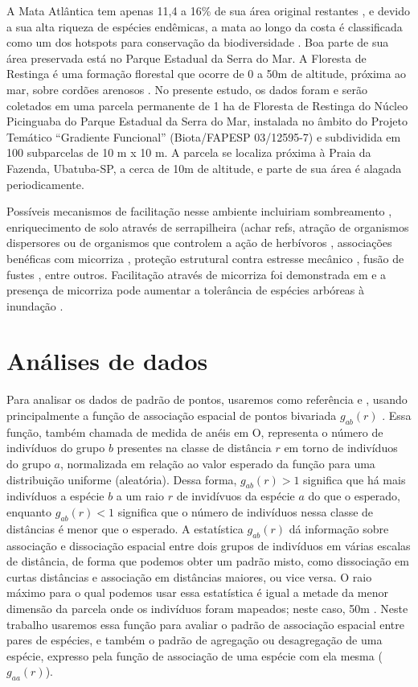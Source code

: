 \documentclass[twoside,12pt,a4paper]{report}
\begin{document}
A Mata Atlântica tem apenas 11,4 a 16\% de sua área original restantes \citep{Ribeiro2009}, e
devido a sua alta riqueza de espécies endêmicas, a mata ao longo da costa é classificada como um dos
hotspots para conservação da biodiversidade \citep{Myers2000}. Boa parte de sua área preservada
está no Parque Estadual da Serra do Mar. A Floresta de Restinga é uma formação florestal que ocorre
de 0 a 50m de altitude, próxima ao mar, sobre cordões arenosos \citep{Joly2008}. No presente
estudo, os dados foram e serão coletados em uma parcela permanente de 1 ha de Floresta de Restinga
do Núcleo Picinguaba do Parque Estadual da Serra do Mar, instalada no âmbito do Projeto Temático
“Gradiente Funcional” (Biota/FAPESP 03/12595-7) e subdividida em 100 subparcelas de 10 m x 10 m. A
parcela se localiza próxima à Praia da Fazenda, Ubatuba-SP, a cerca de 10m de altitude, e parte de
sua área é alagada periodicamente.

Possíveis mecanismos de facilitação nesse ambiente incluiriam sombreamento
\citep{Castanho2014, etc}, enriquecimento de solo através de serrapilheira (achar refs, atração de
organismos dispersores \citep{achar refs CallawayBook} ou de organismos que controlem a ação de
herbívoros \citep{refs}, associações benéficas com micorriza \citep{Simard1997}, proteção
estrutural contra estresse mecânico \citep{refs}, fusão de fustes \citep{McIntire2011}, entre
outros. Facilitação através de micorriza foi demonstrada em \citep{Simard1997} e a presença de
micorriza pode aumentar a tolerância de espécies arbóreas à inundação \citep{Fougnies2007}. 

\section{Análises de dados}

Para analisar os dados de padrão de pontos, usaremos como referência \citep{IllianBook} e
\citep{WiegandBook}, usando principalmente a função de associação espacial de pontos bivariada
$g_{ab}(r)$ \citep{IllianBook,WiegandBook,Stoyan1994}. Essa função, também chamada de medida de
anéis em O, representa o número de indivíduos do grupo $b$ presentes na classe de distância $r$ em
torno de indivíduos do grupo $a$, normalizada em relação ao valor esperado da função para uma
distribuição uniforme (aleatória). Dessa forma, $g_{ab}(r) > 1$ significa que há mais indivíduos a
espécie $b$ a um raio $r$ de invidívuos da espécie $a$ do que o esperado,
enquanto $g_{ab}(r) < 1 $ significa que o número de indivíduos nessa classe de distâncias é menor
que o esperado. A estatística $g_{ab}(r)$ dá informação sobre associação e dissociação espacial
entre dois grupos de indivíduos em várias escalas de distância, de forma que podemos obter um padrão
misto, como dissociação em curtas distâncias e associação em distâncias maiores, ou vice versa. O
raio máximo para o qual podemos usar essa estatística é igual a metade da menor dimensão da parcela
onde os indivíduos foram mapeados; neste caso, 50m \citep{IllianBook}. Neste trabalho usaremos essa
função para avaliar o padrão de associação espacial entre pares de espécies, e também o padrão de
agregação ou desagregação de uma espécie, expresso pela função de associação de uma espécie com ela
mesma ($g_{aa}(r)$).
\end{document}
